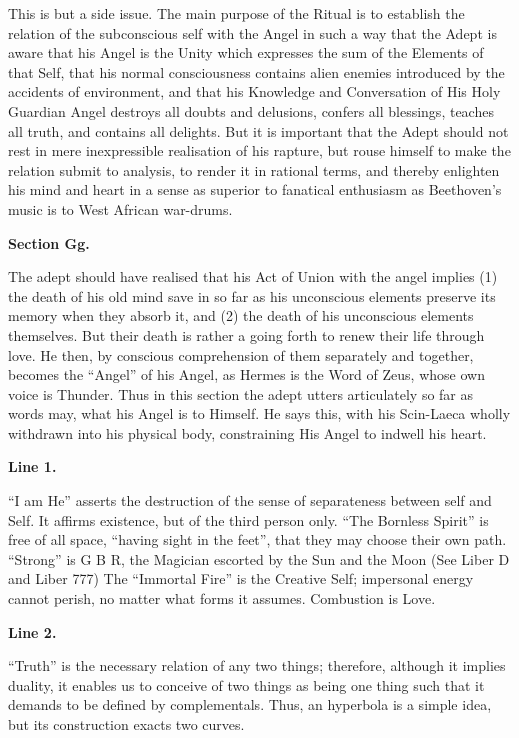 This is but a side issue. The main purpose of the Ritual is to establish the relation of the subconscious self with the Angel in such a way that the Adept is aware that his Angel is the Unity which expresses the sum of the Elements of that Self, that his normal consciousness contains alien enemies introduced by the accidents of environment, and that his Knowledge and Conversation of His Holy Guardian Angel destroys all doubts and delusions, confers all blessings, teaches all truth, and contains all delights. But it is important that the Adept should not rest in mere inexpressible realisation of his rapture, but rouse himself to make the relation submit to analysis, to render it in rational terms, and thereby enlighten his mind and heart in a sense as superior to fanatical enthusiasm as Beethoven’s music is to West African war-drums.


\pagebreak[1]
\textbf{Section Gg.}


The adept should have realised that his Act of Union with the angel implies (1) the death of his old mind save in so far as his unconscious elements preserve its memory when they absorb it, and (2) the death of his unconscious elements themselves. But their death is rather a going forth to renew their life through love. He then, by conscious comprehension of them separately and together, becomes the \enquote{Angel} of his Angel, as Hermes is the Word of Zeus, whose own voice is Thunder. Thus in this section the adept utters articulately so far as words may, what his Angel is to Himself. He says this, with his Scin-Laeca wholly withdrawn into his physical body, constraining His Angel to indwell his heart.


\pagebreak[1]
\textbf{Line 1.}


\enquote{I am He} asserts the destruction of the sense of separateness between self and Self. It affirms existence, but of the third person only. \enquote{The Bornless Spirit} is free of all space, \enquote{having sight in the feet}, that they may choose their own path. \enquote{Strong} is G B R, the Magician escorted by the Sun and the Moon (See Liber D and Liber 777) The \enquote{Immortal Fire} is the Creative Self; impersonal energy cannot perish, no matter what forms it assumes. Combustion is Love.


\textbf{Line 2.}


\enquote{Truth} is the necessary relation of any two things; therefore, although it implies duality, it enables us to conceive of two things as being one thing such that it demands to be defined by complementals. Thus, an hyperbola is a simple idea, but its construction exacts two curves.


